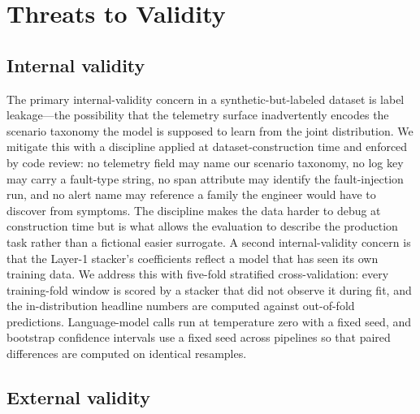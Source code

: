 
\section{Threats to Validity}
\label{sec:threats}

\subsection{Internal validity}
\label{sec:threats:internal}

The primary internal-validity concern in a synthetic-but-labeled dataset is label leakage---the possibility that the telemetry surface inadvertently encodes the scenario taxonomy the model is supposed to learn from the joint distribution. We mitigate this with a discipline applied at dataset-construction time and enforced by code review: no telemetry field may name our scenario taxonomy, no log key may carry a fault-type string, no span attribute may identify the fault-injection run, and no alert name may reference a family the engineer would have to discover from symptoms. The discipline makes the data harder to debug at construction time but is what allows the evaluation to describe the production task rather than a fictional easier surrogate. A second internal-validity concern is that the Layer-1 stacker's coefficients reflect a model that has seen its own training data. We address this with five-fold stratified cross-validation: every training-fold window is scored by a stacker that did not observe it during fit, and the in-distribution headline numbers are computed against out-of-fold predictions. Language-model calls run at temperature zero with a fixed seed, and bootstrap confidence intervals use a fixed seed across pipelines so that paired differences are computed on identical resamples.

\subsection{External validity}
\label{sec:threats:external}

